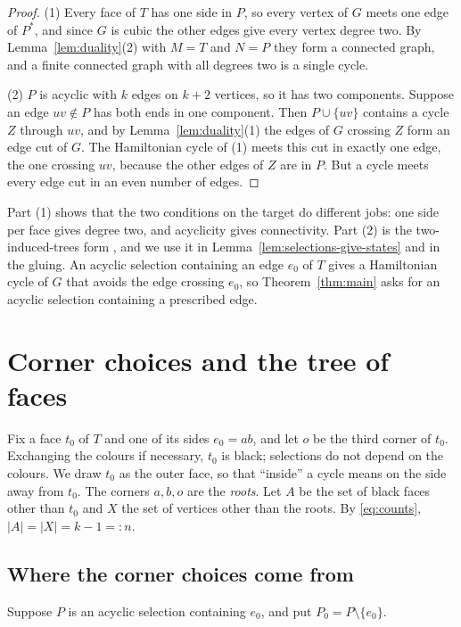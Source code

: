 \documentclass[10pt]{amsart}
\numberwithin{equation}{section}
\theoremstyle{definition}
\theoremstyle{remark}
\newcommand{\T}{T}
\begin{document}
\begin{proof}
(1) Every face of $\T$ has one side in $P$, so every vertex of $G$ meets one edge of $P^*$, and since $G$ is cubic the other edges give every vertex degree two.
By Lemma~\ref{lem:duality}(2) with $M=\T$ and $N=P$ they form a connected graph, and a finite connected graph with all degrees two is a single cycle.

(2) $P$ is acyclic with $k$ edges on $k+2$ vertices, so it has two components.
Suppose an edge $uv\notin P$ has both ends in one component.
Then $P\cup\{uv\}$ contains a cycle $Z$ through $uv$, and by Lemma~\ref{lem:duality}(1) the edges of $G$ crossing $Z$ form an edge cut of $G$.
The Hamiltonian cycle of (1) meets this cut in exactly one edge, the one crossing $uv$, because the other edges of $Z$ are in $P$.
But a cycle meets every edge cut in an even number of edges.
\end{proof}

Part (1) shows that the two conditions on the target do different jobs: one side per face gives degree two, and acyclicity gives connectivity.
Part (2) is the two-induced-trees form \cite{Stein1971,Alt2016}, and we use it in Lemma~\ref{lem:selections-give-states} and in the gluing.
An acyclic selection containing an edge $e_0$ of $\T$ gives a Hamiltonian cycle of $G$ that avoids the edge crossing $e_0$, so Theorem~\ref{thm:main} asks for an acyclic selection containing a prescribed edge.

\section{Corner choices and the tree of faces}\label{sec:corners}

Fix a face $t_0$ of $\T$ and one of its sides $e_0=ab$, and let $o$ be the third corner of $t_0$.
Exchanging the colours if necessary, $t_0$ is black; selections do not depend on the colours.
We draw $t_0$ as the outer face, so that ``inside'' a cycle means on the side away from $t_0$.
The corners $a,b,o$ are the \emph{roots}.
Let $A$ be the set of black faces other than $t_0$ and $X$ the set of vertices other than the roots.
By \eqref{eq:counts}, $|A|=|X|=k-1=:n$.

\subsection*{Where the corner choices come from}
Suppose $P$ is an acyclic selection containing $e_0$, and put $P_0=P\setminus\{e_0\}$.
\end{document}
